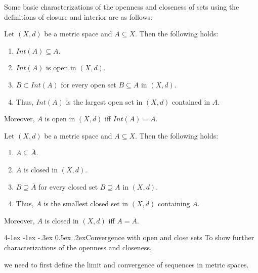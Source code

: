 \documentclass{tufte-handout}
\makeatletter
\renewcommand{\paragraph}{\@startsection{paragraph}%
    {4}{\z@}{-1ex \@plus -1ex \@minus -.3ex}%
    {0.5ex \@plus .2ex}{\normalfont\normalsize\bfseries}}
\makeatother
\begin{document}
Some basic characterizations of the openness and closeness of sets using the definitions of closure and interior are as follows:
\begin{Theorem}
    Let \((X, d)\) be a metric space and \( A \subseteq X \). Then the following holds:
    \begin{enumerate}
        \item \( Int(A) \subseteq A \).
        \item \( Int(A) \) is open in \( (X, d) \).
        \item \(B \subset Int(A)\) for every open set \( B \subseteq A \) in \( (X, d) \).
        \item Thus, \( Int(A) \) is the largest open set in \( (X, d) \) contained in \( A \).
    \end{enumerate}
    Moreover, \( A \) is open in \( (X, d) \) iff \( Int(A) = A \).
\end{Theorem}

\begin{Theorem}
    Let \((X, d)\) be a metric space and \( A \subseteq X \). Then the following holds:
    \begin{enumerate}
        \item \( A \subseteq \overline{A} \).
        \item \( \overline{A} \) is closed in \( (X, d) \).
        \item \( B \supseteq \overline{A} \) for every closed set \( B \supseteq A \) in \( (X, d) \).
        \item Thus, \( \overline{A} \) is the smallest closed set in \( (X, d) \) containing \( A \).
    \end{enumerate}
    Moreover, \( A \) is closed in \( (X, d) \) iff \( A = \overline{A} \).
\end{Theorem}



\paragraph{Convergence with open and close sets}
To show further characterizations of the openness and closeness,

we need to first define the limit and convergence 
of sequences in metric spaces.
\end{document}

